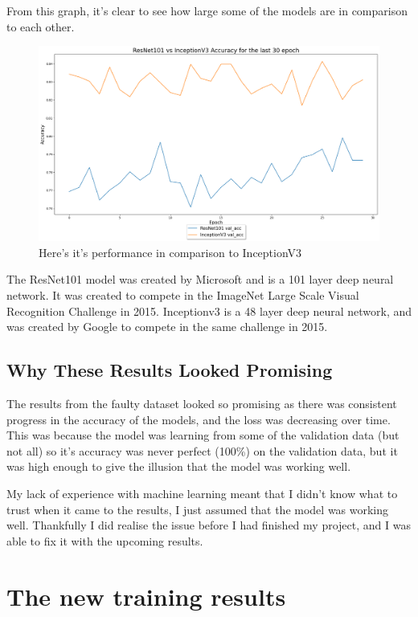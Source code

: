 \documentclass[]{final_report}
\begin{document}
From this graph, it's clear to see how large some of the models are in comparison to each other.

\begin{figure}[ht!]
  \centering
  \includegraphics[width=120mm]{images/ResNet101-vs-Inceptionv3.png}
  \caption{Here's it's performance in comparison to InceptionV3}
\end{figure}

The ResNet101\cite{DBLP:journals/corr/HeZRS15} model was created by Microsoft and is a 101 layer deep neural network.
It was created to compete in the ImageNet Large Scale Visual Recognition Challenge\cite{ILSVRC} in 2015.
Inceptionv3 is a 48 layer deep neural network, and was created by Google to compete in the same challenge in 2015.

\section{Why These Results Looked Promising}
The results from the faulty dataset looked so promising as there was consistent progress in the accuracy of the models, and the loss was decreasing over time. This was because the model was learning from some of the validation data (but not all) so it's accuracy was never perfect (100\%) on the validation data, but it was high enough to give the illusion that the model was working well.

My lack of experience with machine learning meant that I didn't know what to trust when it came to the results, I just assumed that the model was working well. Thankfully I did realise the issue before I had finished my project, and I was able to fix it with the upcoming results.

\chapter{The new training results}
\end{document}
